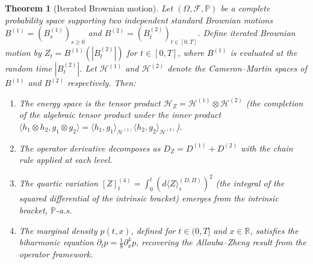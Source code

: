 \documentclass[12pt]{article}
\theoremstyle{plain}
\newtheorem{theorem}{Theorem}[section]
\theoremstyle{definition}
\theoremstyle{remark}
\newcommand{\R}{\mathbb{R}}
\newcommand{\F}{\mathcal{F}}
\newcommand{\PP}{\mathbb{P}}
\newcommand{\HH}{\mathcal{H}}
\begin{document}
\begin{theorem}[Iterated Brownian motion]\label{thm:iteratedBM}
Let $(\Omega, \F, \PP)$ be a complete probability space supporting two independent standard Brownian motions $B^{(1)} = (B_s^{(1)})_{s \geq 0}$ and $B^{(2)} = (B_t^{(2)})_{t \in [0,T]}$. Define iterated Brownian motion by $Z_t = B^{(1)}(|B_t^{(2)}|)$ for $t \in [0,T]$, where $B^{(1)}$ is evaluated at the random time $|B_t^{(2)}|$. Let $\HH^{(1)}$ and $\HH^{(2)}$ denote the Cameron--Martin spaces of $B^{(1)}$ and $B^{(2)}$ respectively. Then:
\begin{enumerate}[label=(\alph*)]
\item The energy space is the tensor product $\HH_Z = \HH^{(1)} \otimes \HH^{(2)}$ (the completion of the algebraic tensor product under the inner product $\langle h_1 \otimes h_2, g_1 \otimes g_2 \rangle = \langle h_1, g_1 \rangle_{\HH^{(1)}} \langle h_2, g_2 \rangle_{\HH^{(2)}}$).
\item The operator derivative decomposes as $D_Z = D^{(1)} + D^{(2)}$ with the chain rule applied at each level.
\item The quartic variation $[Z]_t^{(4)} = \int_0^t (d\langle Z \rangle_s^{(D,\Pi)})^2$ (the integral of the squared differential of the intrinsic bracket) emerges from the intrinsic bracket, $\PP$-a.s.
\item The marginal density $p(t,x)$, defined for $t \in (0,T]$ and $x \in \R$, satisfies the biharmonic equation $\partial_t p = \frac{1}{8}\partial_x^4 p$, recovering the Allouba--Zheng result \cite{AlloubaZheng2001} from the operator framework.
\end{enumerate}
\end{theorem}
\end{document}

